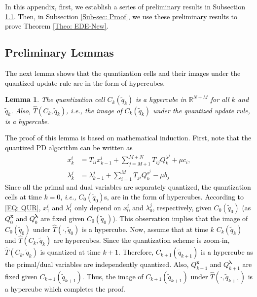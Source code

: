\documentclass[10pt,twocolumn,twoside]{IEEEtran}
\newtheorem{lemma}{Lemma}
\begin{document}
\section{}\label{App: EDE-New}
\textcolor{black}{In this appendix, first, we establish a series of preliminary results in Subsection \ref{Sub-sec: Prelim}. Then, in Subsection \ref{Sub-sec: Proof}, we  use these preliminary results to prove Theorem \ref{Theo: EDE-New}. }
\subsection{Preliminary Lemmas}\label{Sub-sec: Prelim}
\textcolor{black}{ The next lemma shows that the quantization cells and their images under the quantized update rule are in the form of hypercubes. }
\begin{lemma}\label{Lem: Hyper-Cube}
\textcolor{black}{ The quantization cell $C_k{\left({\tilde{q}_k}\right)}$ is a hypercube in ${\ensuremath{{\ensuremath{\mathbb{{R}}}}}}^{N+M}$ for all $k$ and $\tilde{q}_k$. Also, {\ensuremath{\hat{T}\left({C_k},{\tilde{q}_k}\right)}}, \emph{i.e.,} the image of $C_k{\left({\tilde{q}_k}\right)}$ under the quantized update rule, is a hypercube.}
\end{lemma}
\begin{IEEEproof}
\textcolor{black}{ The proof of this lemma is based on mathematical induction. First, note that the quantized PD algorithm can be written as 
\begin{align}\label{EQ: QUR}
x^{i}_{k}&=T_{ii}x^{i}_{k-1}+\sum_{j=M+1}^{M+N}T_{ij}Q^{\lambda^j}_k+\mu c_i,\nonumber\\
\lambda^{j}_{k}&=\lambda^j_{k-1}+\sum_{i=1}^MT_{ji}Q^{x^i}_k-\mu b_j
\end{align}
 Since all the primal and dual variables are separately quantized, the quantization cells at time $k=0$, \emph{i.e.,} $C_0{\left({\tilde{q}_0}\right)}$s, are in the form of hypercubes. According to \eqref{EQ: QUR}, $x^{i}_{1}$ and $\lambda^{j}_{1}$ only depend on $x^{i}_{0}$ and $\lambda^{j}_{0}$, respectively, given $C_0{\left({\tilde{q}_0}\right)}$ (as $Q^{{\ensuremath{\boldsymbol{{x}}}}}_0$ and $Q^{{\ensuremath{\boldsymbol{{\lambda}}}}}_0$ are fixed given $C_0{\left({\tilde{q}_0}\right)}$). This observation implies that the image of $C_0{\left({\tilde{q}_0}\right)}$ under ${\ensuremath{\hat{T}\left({\cdot},{\tilde{q}_0}\right)}}$ is a hypercube. Now, assume that at time $k$ $C_k{\left({\tilde{q}_k}\right)}$ and ${\ensuremath{\hat{T}\left({C_k},{\tilde{q}_k}\right)}}$ are hypercubes. Since the quantization scheme is zoom-in, ${\ensuremath{\hat{T}\left({C_k},{\tilde{q}_k}\right)}}$ is quantized at time $k+1$. Therefore, $C_{k+1}{\left({\tilde{q}_{k+1}}\right)}$ is a hypercube as the primal/dual variables are independently quantized. Also, $Q^{{\ensuremath{\boldsymbol{{x}}}}}_{k+1}$ and $Q^{{\ensuremath{\boldsymbol{{\lambda}}}}}_{k+1}$ are fixed given $C_{k+1}{\left({\tilde{q}_{k+1}}\right)}$. Thus, the image of $C_{k+1}{\left({\tilde{q}_{k+1}}\right)}$ under ${\ensuremath{\hat{T}\left({\cdot},{\tilde{q}_{k+1}}\right)}}$ is a hypercube which completes the proof. }
\end{IEEEproof}
\end{document}
